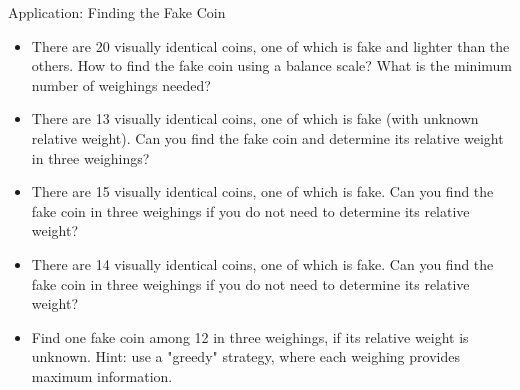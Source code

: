 \documentclass[handout,aspectratio=169]{beamer}
\newcommand{\pitem}{\pause\item}
\begin{document}
\begin{frame}{Application: Finding the Fake Coin}
    \begin{itemize}
        \item There are 20 visually identical coins, one of which is fake and lighter than the others.
        How to find the fake coin using a balance scale? What is the minimum number of weighings needed?

        \pitem There are 13 visually identical coins, one of which is fake (with unknown relative weight).
        Can you find the fake coin and determine its relative weight in three weighings?

        \pitem There are 15 visually identical coins, one of which is fake. Can you find the fake coin in three weighings
        if you do not need to determine its relative weight?

        \pitem There are 14 visually identical coins, one of which is fake. Can you find the fake coin in three weighings
        if you do not need to determine its relative weight?

        \pitem Find one fake coin among 12 in three weighings, if its relative weight is unknown. Hint: use a "greedy" strategy, where each weighing provides maximum information.
    \end{itemize}
\end{frame}
\end{document}
